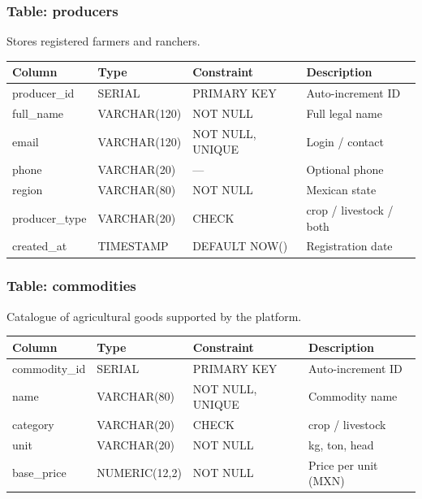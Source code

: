 \documentclass[12pt, a4paper]{article}
\begin{document}
\subsubsection{Table: producers}

Stores registered farmers and ranchers.

\begin{center}
\begin{tabular}{llll}
  \toprule
  \textbf{Column} & \textbf{Type} & \textbf{Constraint} & \textbf{Description} \\
  \midrule
  producer\_id   & SERIAL        & PRIMARY KEY         & Auto-increment ID \\
  full\_name     & VARCHAR(120)  & NOT NULL            & Full legal name \\
  email          & VARCHAR(120)  & NOT NULL, UNIQUE    & Login / contact \\
  phone          & VARCHAR(20)   & —                   & Optional phone \\
  region         & VARCHAR(80)   & NOT NULL            & Mexican state \\
  producer\_type & VARCHAR(20)   & CHECK               & crop / livestock / both \\
  created\_at    & TIMESTAMP     & DEFAULT NOW()       & Registration date \\
  \bottomrule
\end{tabular}
\end{center}

\subsubsection{Table: commodities}

Catalogue of agricultural goods supported by the platform.

\begin{center}
\begin{tabular}{llll}
  \toprule
  \textbf{Column}  & \textbf{Type}     & \textbf{Constraint} & \textbf{Description} \\
  \midrule
  commodity\_id & SERIAL         & PRIMARY KEY  & Auto-increment ID \\
  name          & VARCHAR(80)    & NOT NULL, UNIQUE & Commodity name \\
  category      & VARCHAR(20)    & CHECK        & crop / livestock \\
  unit          & VARCHAR(20)    & NOT NULL     & kg, ton, head \\
  base\_price   & NUMERIC(12,2)  & NOT NULL     & Price per unit (MXN) \\
  \bottomrule
\end{tabular}
\end{center}
\end{document}
